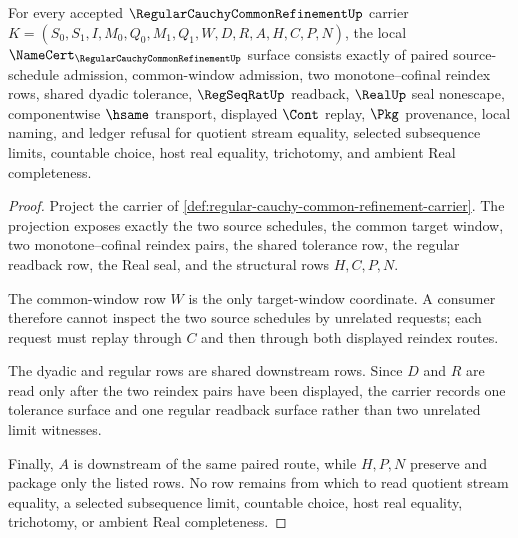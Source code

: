 \begin{theorem}
\label{thm:regular-cauchy-common-refinement-obligations}
For every accepted $\RegularCauchyCommonRefinementUp$ carrier $K=(S_0,S_1,I,M_0,Q_0,M_1,Q_1,W,D,R,A,H,C,P,N)$, the local $\NameCert_{\RegularCauchyCommonRefinementUp}$ surface consists exactly of paired source-schedule admission, common-window admission, two monotone--cofinal reindex rows, shared dyadic tolerance, $\RegSeqRatUp$ readback, $\RealUp$ seal nonescape, componentwise $\hsame$ transport, displayed $\Cont$ replay, $\Pkg$ provenance, local naming, and ledger refusal for quotient stream equality, selected subsequence limits, countable choice, host real equality, trichotomy, and ambient Real completeness.
\end{theorem}
\begin{proof}
Project the carrier of \autoref{def:regular-cauchy-common-refinement-carrier}. The projection exposes exactly the two source schedules, the common target window, two monotone--cofinal reindex pairs, the shared tolerance row, the regular readback row, the Real seal, and the structural rows $H,C,P,N$.

The common-window row $W$ is the only target-window coordinate. A consumer therefore cannot inspect the two source schedules by unrelated requests; each request must replay through $C$ and then through both displayed reindex routes.

The dyadic and regular rows are shared downstream rows. Since $D$ and $R$ are read only after the two reindex pairs have been displayed, the carrier records one tolerance surface and one regular readback surface rather than two unrelated limit witnesses.

Finally, $A$ is downstream of the same paired route, while $H,P,N$ preserve and package only the listed rows. No row remains from which to read quotient stream equality, a selected subsequence limit, countable choice, host real equality, trichotomy, or ambient Real completeness.
\end{proof}

